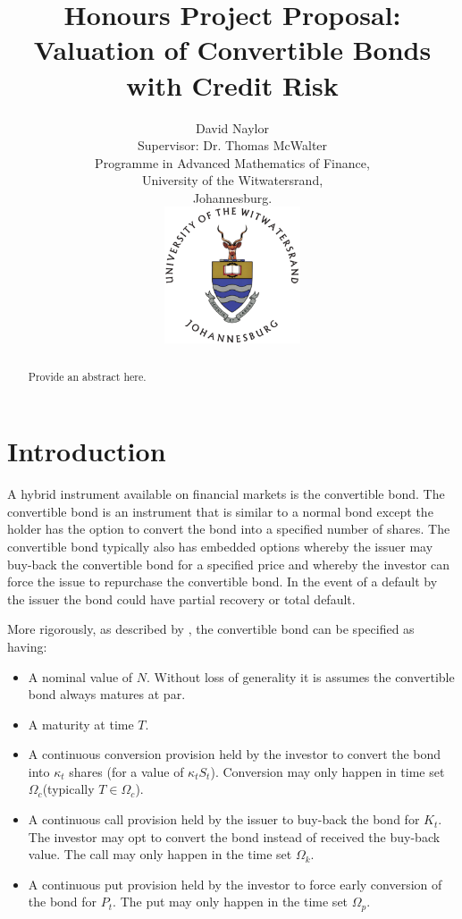 \documentclass[a4paper,11pt,oneside]{article}
\title{Honours Project Proposal:\\
Valuation of Convertible Bonds with Credit Risk}
\author{David Naylor\\[1cm]
Supervisor: Dr. Thomas McWalter\\[3cm]
Programme in Advanced Mathematics of Finance,\\
University of the Witwatersrand,\\
Johannesburg.\\[2cm]
\includegraphics[width=4cm]{../common/WitsColourLogo}\\[2cm]
}
\newcommand{\setlinespacing}[1]
           {\renewcommand{\baselinestretch}{#1}\small\normalsize}
\def\convK{\ensuremath{\kappa_t}\xspace}
\def\convKS{\ensuremath{\convK S_t}\xspace}
\def\convT{\ensuremath{\Omega_c}\xspace}
\def\putK{\ensuremath{P_t}\xspace}
\def\putT{\ensuremath{\Omega_p}\xspace}
\def\callK{\ensuremath{K_t}\xspace}
\def\callT{\ensuremath{\Omega_k}\xspace}
\begin{document}
\maketitle
\thispagestyle{empty}

\setlinespacing{1.20}
\newpage

\setcounter{page}{1}


\def\abstractname{\Large Abstract}
\begin{abstract}
Provide an abstract here.
\end{abstract}



\section{Introduction}
A hybrid instrument available on financial markets is the convertible bond.  The convertible bond is an instrument that is similar to a normal bond except the holder has the option to convert the bond into a specified number of shares.  The convertible bond typically also has embedded options whereby the issuer may buy-back the convertible bond for a specified price and whereby the investor can force the issue to repurchase the convertible bond.  In the event of a default by the issuer the bond could have partial recovery or total default.

More rigorously, as described by \cite{AKW08}, the convertible bond can be specified as having:
\begin{itemize}
 \item A nominal value of $N$.  Without loss of generality it is assumes the convertible bond always matures at par.
 \item A maturity at time $T$.
 \item A continuous conversion provision held by the investor to convert the bond into \convK shares (for a value of \convKS).  Conversion may only happen in time set \convT (typically $T \in \convT$).
 \item A continuous call provision held by the issuer to buy-back the bond for \callK.  The investor may opt to convert the bond instead of received the buy-back value.  The call may only happen in the time set \callT.
 \item A continuous put provision held by the investor to force early conversion of the bond for \putK.  The put may only happen in the time set \putT.
\end{itemize}
\end{document}
